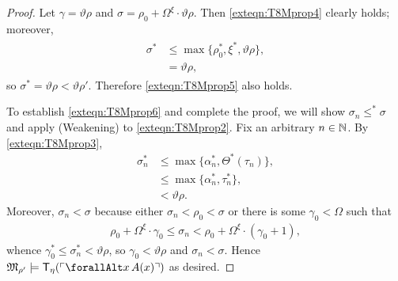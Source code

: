 \documentclass[UKenglish,cleveref,DIV=12]{scrartcl}
\let\forall\forallAlt
\theoremstyle{definition}
\theoremstyle{definition}
\begin{document}
\begin{proof}
Let $\gamma=\vartheta\rho$ and
  $\sigma=\rho_0+\Omega^\xi\cdot\vartheta\rho$.
%
Then \cref{exteqn:T8Mprop4} clearly holds; moreover,
\begin{align}\label{exteqn:T8Mprop7}\begin{split}
  \sigma^*&\le\max\{\rho_0^*,\xi^*,\vartheta\rho\},\\
	&=\vartheta\rho,\end{split}
\end{align}
so $\sigma^*=\vartheta\rho<\vartheta\rho'$. Therefore \cref{exteqn:T8Mprop5} also holds.

To establish \cref{exteqn:T8Mprop6} and complete the proof, we will show $\sigma_n\le^*\sigma$ and apply (Weakening) to \cref{exteqn:T8Mprop2}. Fix an arbitrary $n\in\mathbb N$. By \cref{exteqn:T8Mprop3},
\begin{align*}
  \sigma_n^*&\le\max\{\alpha_n^*,\Theta^*(\tau_n)\},\\
	  &\le\max\{\alpha_n^*,\tau_n^*\},\\
	  &<\vartheta\rho.
\end{align*}
Moreover, $\sigma_n<\sigma$ because either $\sigma_n<\rho_0<\sigma$ or there is some $\gamma_0<\Omega$ such that
\begin{align*}
  \rho_0+\Omega^\xi\cdot\gamma_0\le\sigma_n<\rho_0+\Omega^\xi\cdot(\gamma_0+1),
\end{align*}
whence $\gamma_0^*\le\sigma^*_n<\vartheta\rho$, so $\gamma_0<\vartheta\rho$ and $\sigma_n<\sigma$. Hence $\mathfrak M_{\rho'}\models \T_\eta(\gn{\forall x\,A(x)})$ as desired.
\end{proof}
\end{document}

